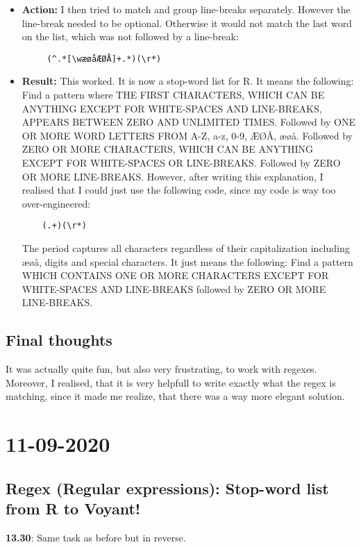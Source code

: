 \documentclass{article}
\begin{document}
\begin{itemize}
\item \textbf{Action:} I then tried to match and group line-breaks separately. However the line-break needed to be optional. Otherwise it would not match the last word on the list, which was not followed by a line-break:  
\begin{verbatim}
     (^.*[\wæøåÆØÅ]+.*)(\r*)
\end{verbatim}
\item \textbf{Result:} This worked. It is now a stop-word list for R. It means the following: Find a pattern where THE FIRST CHARACTERS, WHICH CAN BE ANYTHING EXCEPT FOR WHITE-SPACES AND LINE-BREAKS, APPEARS BETWEEN ZERO AND UNLIMITED TIMES. Followed by ONE OR MORE WORD LETTERS FROM A-Z, a-z, 0-9, ÆØÅ, æøå. Followed by ZERO OR MORE CHARACTERS, WHICH CAN BE ANYTHING EXCEPT FOR WHITE-SPACES OR LINE-BREAKS. Followed by ZERO OR MORE LINE-BREAKS. 
\break{}
However, after writing this explanation, I realised that I could just use the following code, since my code is way too over-engineered:
\begin{verbatim}
    (.+)(\r*)  
\end{verbatim}
The period captures all characters regardless of their capitalization including æøå, digits and special characters. It just means the following: Find a pattern WHICH CONTAINS ONE OR MORE CHARACTERS EXCEPT FOR WHITE-SPACES AND LINE-BREAKS followed by ZERO OR MORE LINE-BREAKS. 
\end{itemize}

\subsection{Final thoughts}
It was actually quite fun, but also very frustrating, to work with regexes. Moreover, I realised, that it is very helpfull to write exactly what the regex is matching, since it made me realize, that there was a way more elegant solution. 

\section{11-09-2020}
\subsection{Regex (Regular expressions): Stop-word list from R to Voyant!}
\textbf{13.30}: Same task as before but in reverse.

\end{document}
